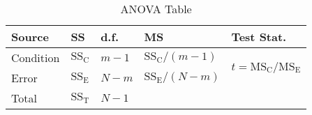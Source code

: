 \begin{table}[!htbp]
      \centering
      \caption{ANOVA Table}\vspace{1mm}
      \begin{tabularx}{0.85\linewidth}{@{}YYYYY@{}}
            \toprule
            Source    & SS                     & d.f.    & MS                           & Test Stat.                                                   \\
            \midrule
            Condition & $ \text{SS}_\text{C} $ & $ m-1 $ & $ \text{SS}_\text{C}/(m-1) $ &  \\
            Error     & $ \text{SS}_\text{E} $ & $ N-m $ & $ \text{SS}_\text{E}/(N-m) $                                                                \\
            \midrule
            Total     & $ \text{SS}_\text{T} $ & $ N-1 $                                                                                               \\
      \end{tabularx}
\end{table}
